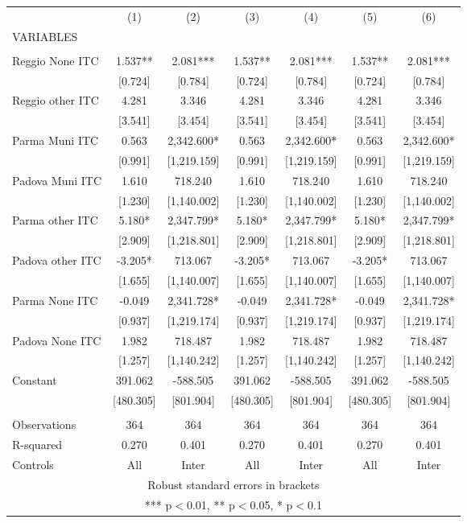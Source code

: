 \begin{tabular}{lcccccc} \hline
 & (1) & (2) & (3) & (4) & (5) & (6) \\
VARIABLES &  &  &  &  &  &  \\ \hline
 &  &  &  &  &  &  \\
Reggio None ITC & 1.537** & 2.081*** & 1.537** & 2.081*** & 1.537** & 2.081*** \\
 & [0.724] & [0.784] & [0.724] & [0.784] & [0.724] & [0.784] \\
Reggio other ITC & 4.281 & 3.346 & 4.281 & 3.346 & 4.281 & 3.346 \\
 & [3.541] & [3.454] & [3.541] & [3.454] & [3.541] & [3.454] \\
Parma Muni ITC & 0.563 & 2,342.600* & 0.563 & 2,342.600* & 0.563 & 2,342.600* \\
 & [0.991] & [1,219.159] & [0.991] & [1,219.159] & [0.991] & [1,219.159] \\
Padova Muni ITC & 1.610 & 718.240 & 1.610 & 718.240 & 1.610 & 718.240 \\
 & [1.230] & [1,140.002] & [1.230] & [1,140.002] & [1.230] & [1,140.002] \\
Parma other ITC & 5.180* & 2,347.799* & 5.180* & 2,347.799* & 5.180* & 2,347.799* \\
 & [2.909] & [1,218.801] & [2.909] & [1,218.801] & [2.909] & [1,218.801] \\
Padova other ITC & -3.205* & 713.067 & -3.205* & 713.067 & -3.205* & 713.067 \\
 & [1.655] & [1,140.007] & [1.655] & [1,140.007] & [1.655] & [1,140.007] \\
Parma None ITC & -0.049 & 2,341.728* & -0.049 & 2,341.728* & -0.049 & 2,341.728* \\
 & [0.937] & [1,219.174] & [0.937] & [1,219.174] & [0.937] & [1,219.174] \\
Padova None ITC & 1.982 & 718.487 & 1.982 & 718.487 & 1.982 & 718.487 \\
 & [1.257] & [1,140.242] & [1.257] & [1,140.242] & [1.257] & [1,140.242] \\
Constant & 391.062 & -588.505 & 391.062 & -588.505 & 391.062 & -588.505 \\
 & [480.305] & [801.904] & [480.305] & [801.904] & [480.305] & [801.904] \\
 &  &  &  &  &  &  \\
Observations & 364 & 364 & 364 & 364 & 364 & 364 \\
R-squared & 0.270 & 0.401 & 0.270 & 0.401 & 0.270 & 0.401 \\
 Controls & All & Inter & All & Inter & All & Inter \\ \hline
\multicolumn{7}{c}{ Robust standard errors in brackets} \\
\multicolumn{7}{c}{ *** p$<$0.01, ** p$<$0.05, * p$<$0.1} \\
\end{tabular}
